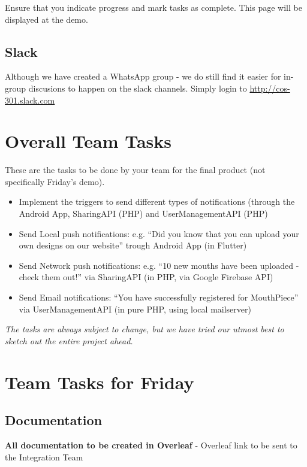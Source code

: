 \documentclass{article}
\begin{document}
Ensure that you indicate progress and mark tasks as complete. This page will be displayed at the demo.

\subsection{Slack}
Although we have created a WhatsApp group - we do still find it easier for in-group discusions to happen on the slack channels. Simply login to \url{http://cos-301.slack.com}

\newpage

\section{Overall Team Tasks}
These are the tasks to be done by your team for the final product (not specifically Friday's demo).

\begin{itemize}
    \item Implement the triggers to send different types of notifications (through the Android App, SharingAPI (PHP) and UserManagementAPI (PHP)
    \item Send Local push notifications: e.g. “Did you know that you can upload your own designs on our website” trough Android App (in Flutter)
    \item Send Network push notifications: e.g. “10 new mouths have been uploaded - check them out!” via SharingAPI (in PHP, via Google Firebase API)
    \item Send Email notifications: “You have successfully registered for MouthPiece” via UserManagementAPI (in pure PHP, using local mailserver)
\end{itemize}

\vspace{1cm}

\begin{center}
   \textit{The tasks are always subject to change, but we have tried our utmost best to sketch out the entire project ahead.}
\end{center}

\newpage


\section{Team Tasks for Friday}

\subsection{Documentation}
\textbf{All documentation to be created in Overleaf} - Overleaf link to be sent to the Integration Team
\end{document}
